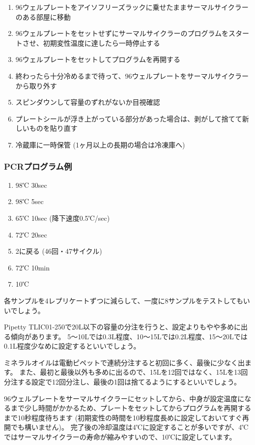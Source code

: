 \documentclass[titlepage,10pt,a4paper,uplatex]{jsbook}
\begin{document}
\begin{enumerate}
\item 96ウェルプレートをアイソフリーズラックに乗せたままサーマルサイクラーのある部屋に移動
\item 96ウェルプレートをセットせずにサーマルサイクラーのプログラムをスタートさせ、初期変性温度に達したら一時停止する
\item 96ウェルプレートをセットしてプログラムを再開する
\item 終わったら十分冷めるまで待って、96ウェルプレートをサーマルサイクラーから取り外す
\item スピンダウンして容量のずれがないか目視確認
\item プレートシールが浮き上がっている部分があった場合は、剥がして捨てて新しいものを貼り直す
\item 冷蔵庫に一時保管 (1ヶ月以上の長期の場合は冷凍庫へ)
\end{enumerate}

\subsubsection{PCRプログラム例}
\begin{enumerate}
\item 98℃ 30sec
\item 98℃ 5sec
\item 65℃ 10sec (降下速度0.5℃/sec)
\item 72℃ 20sec
\item 2に戻る (46回・47サイクル)
\item 72℃ 10min
\item 10℃
\end{enumerate}

各サンプルを4レプリケートずつに減らして、一度に8サンプルをテストしてもいいでしょう。

Pipetty TLIC01-250で20{\textmu}L以下の容量の分注を行うと、設定よりもやや多めに出る傾向があります。
5～10{\textmu}Lでは0.3{\textmu}L程度、10～15{\textmu}Lでは0.2{\textmu}L程度、15～20{\textmu}Lでは0.1{\textmu}L程度少なめに設定するといいでしょう。

ミネラルオイルは電動ピペットで連続分注すると初回に多く、最後に少なく出ます。
また、最初と最後以外も多めに出るので、15{\textmu}Lを12回ではなく、15{\textmu}Lを13回分注する設定で12回分注し、最後の1回は捨てるようにするといいでしょう。

96ウェルプレートをサーマルサイクラーにセットしてから、中身が設定温度になるまで少し時間がかかるため、プレートをセットしてからプログラムを再開するまで10秒程度待ちます (初期変性の時間を10秒程度長めに設定しておいてすぐ再開でも構いません)。
完了後の冷却温度は4℃に設定することが多いですが、4℃ではサーマルサイクラーの寿命が縮みやすいので、10℃に設定しています。
\end{document}
